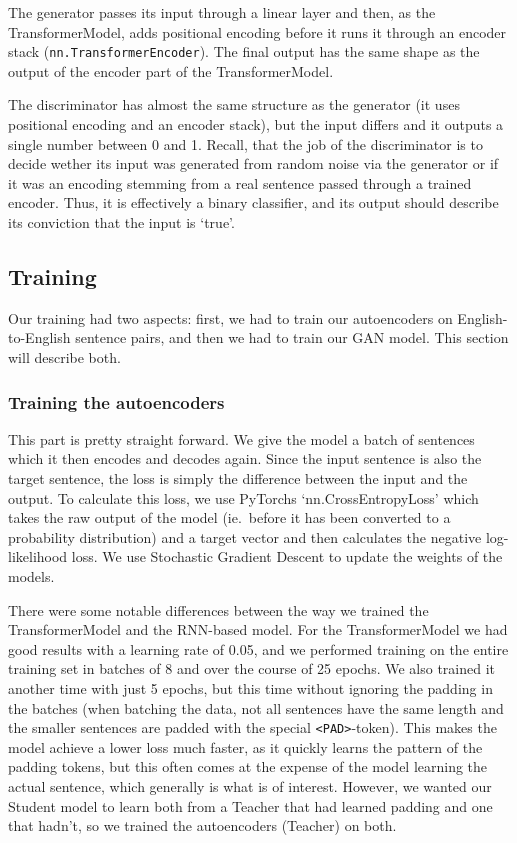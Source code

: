 \documentclass{article}
\begin{document}
The generator passes its input through a linear layer and then, as the
TransformerModel, adds positional encoding before it runs it through an encoder
stack (\texttt{nn.TransformerEncoder}). The final output has the same shape as
the output of the encoder part of the TransformerModel.

The discriminator has almost the same structure as the generator (it uses
positional encoding and an encoder stack), but the input differs and it outputs
a single number between 0 and 1. Recall, that the job of the discriminator is to
decide wether its input was generated from random noise via the generator or if
it was an encoding stemming from a real sentence passed through a trained
encoder. Thus, it is effectively a binary classifier, and its output should
describe its conviction that the input is `true'.

\subsection{Training}\label{sec:training}

Our training had two aspects: first, we had to train our autoencoders on
English-to-English sentence pairs, and then we had to train our GAN model. This
section will describe both.

\subsubsection{Training the autoencoders}\label{sec:trainingAutoEnc}

This part is pretty straight forward. We give the model a batch of sentences
which it then encodes and decodes again. Since the input sentence is also the
target sentence, the loss is simply the difference between the input and the
output. To calculate this loss, we use PyTorchs `nn.CrossEntropyLoss' which
takes the raw output of the model (ie.\ before it has been converted to a
probability distribution) and a target vector and then calculates the negative
log-likelihood loss. We use Stochastic Gradient Descent to update the weights of
the models.

There were some notable differences between the way we trained the
TransformerModel and the RNN-based model. For the TransformerModel we had good
results with a learning rate of 0.05, and we performed training on the entire
training set in batches of 8 and over the course of 25 epochs. We also trained
it another time with just 5 epochs, but this time without ignoring the padding
in the batches (when batching the data, not all sentences have the same length
and the smaller sentences are padded with the special \texttt{<PAD>}-token).
This makes the model achieve a lower loss much faster, as it quickly learns the
pattern of the padding tokens, but this often comes at the expense of the model
learning the actual sentence, which generally is what is of interest. However,
we wanted our Student model to learn both from a Teacher that had learned
padding and one that hadn't, so we trained the autoencoders (Teacher) on both.
\end{document}
